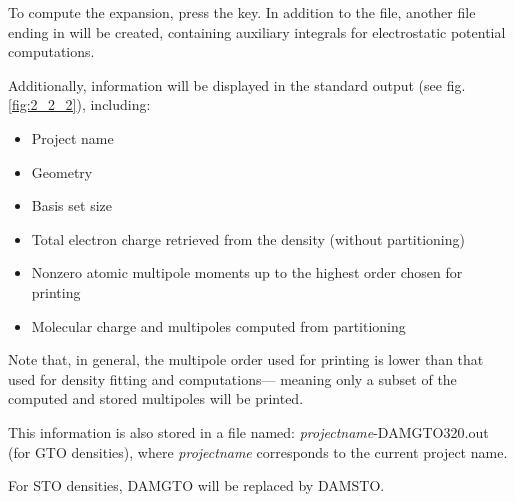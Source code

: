 \documentclass[10pt]{article}
\begin{document}
To compute the expansion, press the \exec key.
In addition to the \damqt{ } file, another file ending in \dmqtv{ }
will be created, containing auxiliary integrals for electrostatic potential computations.

Additionally, information will be displayed in the standard output (see fig. \ref{fig:2_2_2}), including:

\begin{itemize}
\item Project name
\item Geometry
\item Basis set size
\item Total electron charge retrieved from the density (without partitioning)
\item Nonzero atomic multipole moments up to the highest order chosen for printing
\item Molecular charge and multipoles computed from partitioning
\end{itemize}

Note that, in general, the multipole order used for printing is lower
than that used for density fitting and computations—
meaning only a subset of the computed and stored multipoles will be printed.

This information is also stored in a file named:
{\it projectname}-DAMGTO320.out (for GTO densities),
where {\it projectname} corresponds to the current project name.

For STO densities, DAMGTO will be replaced by DAMSTO.

\vspace*{0.3cm}
\end{document}
